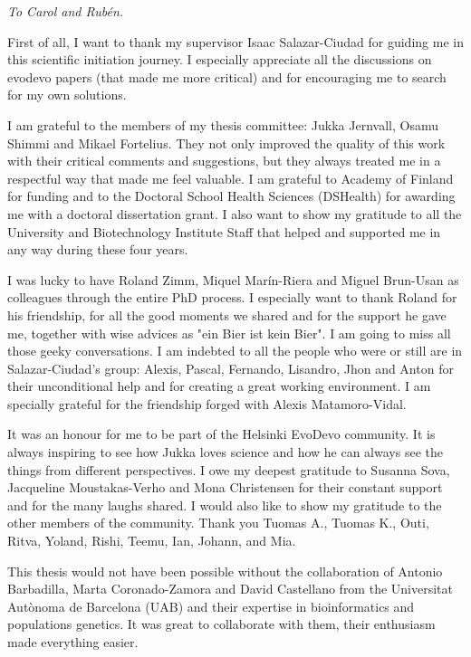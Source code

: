 \setlength{\epigraphrule}{0\p@}
\setlength{\epigraphwidth}{.28\textwidth}
\epigraph{\large{\textit{To Carol and Rub\'{e}n.}}}{}

First of all, I want to thank my supervisor Isaac Salazar-Ciudad for guiding me in this scientific initiation journey. I especially appreciate all the discussions on evodevo papers (that made me more critical) and for encouraging me to search for my own solutions. 
\vspace{1ex}

I am grateful to the members of my thesis committee: Jukka Jernvall, Osamu Shimmi and Mikael Fortelius. They not only improved the quality of this work with their critical comments and suggestions, but they always treated me in a respectful way that made me feel valuable.
I am grateful to Academy of Finland for funding and to the Doctoral School Health Sciences (DSHealth) for awarding me with a doctoral dissertation grant.
I also want to show my gratitude to all the University and Biotechnology Institute Staff that helped and supported me in any way during these four years.
\vspace{1ex}

I was lucky to have Roland Zimm, Miquel Mar\'{i}n-Riera and Miguel Brun-Usan as colleagues through the entire PhD process. I especially want to thank Roland for his friendship, for all the good moments we shared and for the support he gave me, together with wise advices as "ein Bier ist kein Bier". I am going to miss all those geeky conversations.
%
I am indebted to all the people who were or still are in Salazar-Ciudad's group: Alexis, Pascal, Fernando, Lisandro, Jhon and Anton for their unconditional help and for creating a great working environment. I am specially grateful for the friendship forged with Alexis Matamoro-Vidal.
\vspace{1ex}

It was an honour for me to be part of the Helsinki EvoDevo community. It is always inspiring to see how Jukka loves science and how he can always see the things from different perspectives. I owe my deepest gratitude to Susanna Sova, Jacqueline Moustakas-Verho and Mona Christensen for their constant support and for the many laughs shared. I would also like to show my gratitude to the other members of the community. Thank you Tuomas A., Tuomas K., Outi, Ritva, Yoland, Rishi, Teemu, Ian, Johann, and Mia.  

\vspace{1ex}
This thesis would not have been possible without the collaboration of Antonio Barbadilla, Marta Coronado-Zamora and David Castellano from the Universitat Aut\`{o}noma de Barcelona (UAB) and their expertise in bioinformatics and populations genetics. It was great to collaborate with them, their enthusiasm made everything easier.

